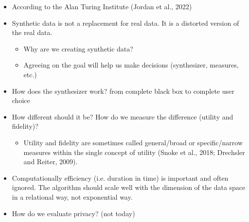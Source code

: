 \documentclass[t,8pt,utfx8]{beamer}
\begin{document}
\begin{spacing}{1.25}
{\begin{itemize}
    \item According to the Alan Turing Institute (Jordan et al., 2022)
    \item Synthetic data is not a replacement for real data.  It is a distorted version of the real data.
    \begin{itemize}
        \item Why are we creating synthetic data?  
        \item Agreeing on the goal will help us make decisions (synthesizer, measures, etc.)
    \end{itemize}
    \item How does the synthesizer work? from complete black box to complete user choice
    \item How different should it be?  How do we measure the difference (utility and fidelity)?  
    \begin{itemize}
        \item Utility and fidelity are sometimes called general/broad or specific/narrow measures within the single concept of utility (Snoke et al., 2018; Drechsler and Reiter, 2009). 
    \end{itemize}
    \item Computationally efficiency (i.e. duration in time) is important and often ignored.  The algorithm should scale well with the dimension of the data space in a relational way, not exponential way.
    \item How do we evaluate privacy? (not today)
\end{itemize}
}




\end{spacing}
\end{document}
